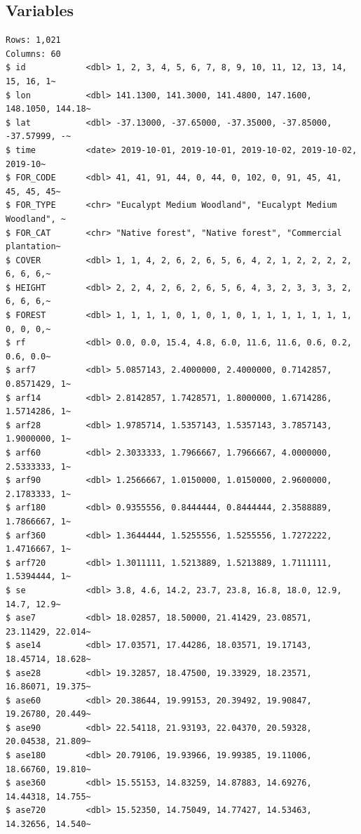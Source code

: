 \documentclass[
  letterpaper,
]{book}
\begin{document}
\hypertarget{variables-1}{%
\subsection*{Variables}\label{variables-1}}

\begin{verbatim}
Rows: 1,021
Columns: 60
$ id            <dbl> 1, 2, 3, 4, 5, 6, 7, 8, 9, 10, 11, 12, 13, 14, 15, 16, 1~
$ lon           <dbl> 141.1300, 141.3000, 141.4800, 147.1600, 148.1050, 144.18~
$ lat           <dbl> -37.13000, -37.65000, -37.35000, -37.85000, -37.57999, -~
$ time          <date> 2019-10-01, 2019-10-01, 2019-10-02, 2019-10-02, 2019-10~
$ FOR_CODE      <dbl> 41, 41, 91, 44, 0, 44, 0, 102, 0, 91, 45, 41, 45, 45, 45~
$ FOR_TYPE      <chr> "Eucalypt Medium Woodland", "Eucalypt Medium Woodland", ~
$ FOR_CAT       <chr> "Native forest", "Native forest", "Commercial plantation~
$ COVER         <dbl> 1, 1, 4, 2, 6, 2, 6, 5, 6, 4, 2, 1, 2, 2, 2, 2, 6, 6, 6,~
$ HEIGHT        <dbl> 2, 2, 4, 2, 6, 2, 6, 5, 6, 4, 3, 2, 3, 3, 3, 2, 6, 6, 6,~
$ FOREST        <dbl> 1, 1, 1, 1, 0, 1, 0, 1, 0, 1, 1, 1, 1, 1, 1, 1, 0, 0, 0,~
$ rf            <dbl> 0.0, 0.0, 15.4, 4.8, 6.0, 11.6, 11.6, 0.6, 0.2, 0.6, 0.0~
$ arf7          <dbl> 5.0857143, 2.4000000, 2.4000000, 0.7142857, 0.8571429, 1~
$ arf14         <dbl> 2.8142857, 1.7428571, 1.8000000, 1.6714286, 1.5714286, 1~
$ arf28         <dbl> 1.9785714, 1.5357143, 1.5357143, 3.7857143, 1.9000000, 1~
$ arf60         <dbl> 2.3033333, 1.7966667, 1.7966667, 4.0000000, 2.5333333, 1~
$ arf90         <dbl> 1.2566667, 1.0150000, 1.0150000, 2.9600000, 2.1783333, 1~
$ arf180        <dbl> 0.9355556, 0.8444444, 0.8444444, 2.3588889, 1.7866667, 1~
$ arf360        <dbl> 1.3644444, 1.5255556, 1.5255556, 1.7272222, 1.4716667, 1~
$ arf720        <dbl> 1.3011111, 1.5213889, 1.5213889, 1.7111111, 1.5394444, 1~
$ se            <dbl> 3.8, 4.6, 14.2, 23.7, 23.8, 16.8, 18.0, 12.9, 14.7, 12.9~
$ ase7          <dbl> 18.02857, 18.50000, 21.41429, 23.08571, 23.11429, 22.014~
$ ase14         <dbl> 17.03571, 17.44286, 18.03571, 19.17143, 18.45714, 18.628~
$ ase28         <dbl> 19.32857, 18.47500, 19.33929, 18.23571, 16.86071, 19.375~
$ ase60         <dbl> 20.38644, 19.99153, 20.39492, 19.90847, 19.26780, 20.449~
$ ase90         <dbl> 22.54118, 21.93193, 22.04370, 20.59328, 20.04538, 21.809~
$ ase180        <dbl> 20.79106, 19.93966, 19.99385, 19.11006, 18.66760, 19.810~
$ ase360        <dbl> 15.55153, 14.83259, 14.87883, 14.69276, 14.44318, 14.755~
$ ase720        <dbl> 15.52350, 14.75049, 14.77427, 14.53463, 14.32656, 14.540~

\end{verbatim}
\end{document}
